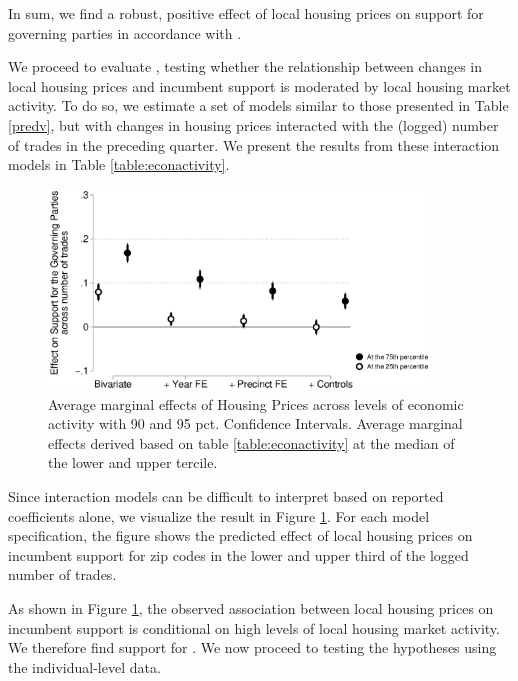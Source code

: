 \documentclass[12pt,a4paper]{article}
\begin{document}
	In sum, we find a robust, positive effect of local housing prices on support for governing parties in accordance with \hone.
	

	We proceed to evaluate \htwo, testing whether the relationship between changes in local housing prices and incumbent support is moderated by local housing market activity. To do so, we estimate a set of models similar to those presented in Table \ref{predv}, but with changes in housing prices interacted with the (logged) number of trades in the preceding quarter. We present the results from these interaction models in Table \ref{table:econactivity}.
	
	
	
	
		\begin{figure}[htbp!]
		\includegraphics[width=0.9\textwidth]{../figures/localactivity.eps}
		\centering
		\caption{Average marginal effects of Housing Prices across levels of economic activity with 90  and 95 pct. Confidence Intervals.  Average marginal effects derived based on table \ref{table:econactivity} at the median of the lower and upper tercile.}\label{localactivity}
	\end{figure}
	
	
	Since interaction models can be difficult to interpret based on reported coefficients alone, we visualize the result in Figure \ref{localactivity}. For each model specification, the figure shows the predicted effect of local housing prices on incumbent support for zip codes in the lower and upper third of the logged number of trades. 	

	
	As shown in Figure \ref{localactivity}, the observed association between local housing prices on incumbent support is conditional on high levels of local housing market activity. We therefore find support for \htwo. We now proceed to testing the hypotheses using the individual-level data.
	
\end{document}
